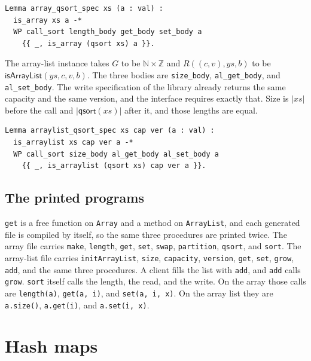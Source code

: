 \documentclass[11pt]{article}
\begin{document}
\begin{lstlisting}
Lemma array_qsort_spec xs (a : val) :
  is_array xs a -*
  WP call_sort length_body get_body set_body a
    {{ _, is_array (qsort xs) a }}.
\end{lstlisting}

The array-list instance takes \(G\) to be \(\mathbb{N} \times \mathbb{Z}\) and \(R((c, v), ys, b)\) to be \(\mathsf{isArrayList}(ys, c, v, b)\).
The three bodies are \texttt{size\_body}, \texttt{al\_get\_body}, and \texttt{al\_set\_body}.
The write specification of the library already returns the same capacity and the same version, and the interface requires exactly that.
Size is \(\lvert xs \rvert\) before the call and \(\lvert \mathsf{qsort}(xs) \rvert\) after it, and those lengths are equal.

\begin{lstlisting}
Lemma arraylist_qsort_spec xs cap ver (a : val) :
  is_arraylist xs cap ver a -*
  WP call_sort size_body al_get_body al_set_body a
    {{ _, is_arraylist (qsort xs) cap ver a }}.
\end{lstlisting}

\subsection{The printed programs}

\texttt{get} is a free function on \texttt{Array} and a method on \texttt{ArrayList}, and each generated file is compiled by itself, so the same three procedures are printed twice.
The array file carries \texttt{make}, \texttt{length}, \texttt{get}, \texttt{set}, \texttt{swap}, \texttt{partition}, \texttt{qsort}, and \texttt{sort}.
The array-list file carries \texttt{initArrayList}, \texttt{size}, \texttt{capacity}, \texttt{version}, \texttt{get}, \texttt{set}, \texttt{grow}, \texttt{add}, and the same three procedures.
A client fills the list with \texttt{add}, and \texttt{add} calls \texttt{grow}.
\texttt{sort} itself calls the length, the read, and the write.
On the array those calls are \texttt{length(a)}, \texttt{get(a, i)}, and \texttt{set(a, i, x)}.
On the array list they are \texttt{a.size()}, \texttt{a.get(i)}, and \texttt{a.set(i, x)}.





\section{Hash maps}
\label{sec:hashmap}
\end{document}
